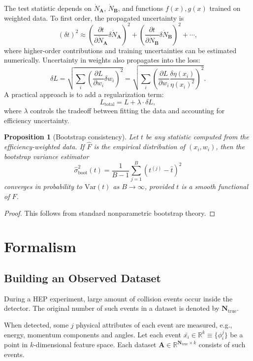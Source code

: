 \documentclass{article}
\newtheorem{proposition}[theorem]{Proposition}
\newcommand{\dataset}[1]{{\mathbf{#1}}}         %
\newcommand{\true}[1]{{\dataset{#1}}_{\text{true}}}  %
\begin{document}
The test statistic depends on \( \dot{N}_{\mathbf{A}} \), \( \dot{N}_{\mathbf{B}} \), and functions \( f(x), g(x) \) trained on weighted data. To first order, the propagated uncertainty is
\[
(\delta t)^2 \approx \left( \frac{\partial t}{\partial \dot{N}_{\mathbf{A}}} \delta \dot{N}_{\mathbf{A}} \right)^2 + \left( \frac{\partial t}{\partial \dot{N}_{\mathbf{B}}} \delta \dot{N}_{\mathbf{B}} \right)^2 + \cdots,
\]
where higher-order contributions and training uncertainties can be estimated numerically. Uncertainty in weights also propagates into the loss:
\[
\delta L = \sqrt{
\sum_{i} \left( \frac{\partial L}{\partial w_i} \delta w_i \right)^2
} = \sqrt{
\sum_{i} \left( \frac{\partial L}{\partial w_i} \frac{\delta \eta(x_i)}{\eta(x_i)^2} \right)^2
}.
\]
A practical approach is to add a regularization term:
\[
L_{\mathrm{total}} = L + \lambda \cdot \delta L,
\]
where \(\lambda\) controls the tradeoff between fitting the data and accounting for efficiency uncertainty.

\begin{proposition}[Bootstrap consistency]
    Let \(t\) be any statistic computed from the efficiency-weighted data. If \(\hat{F}\) is the empirical distribution of \((x_i, w_i)\), then the bootstrap variance estimator
\[
\hat{\sigma}^2_{\mathrm{boot}}(t) = \frac{1}{B-1} \sum_{j=1}^B \left( t^{(j)} - \bar{t} \right)^2
\]
converges in probability to \(\mathrm{Var}(t)\) as \(B \to \infty\), provided \(t\) is a smooth functional of \(F\).
\end{proposition}

\begin{proof}
     This follows from standard nonparametric bootstrap theory. 
\end{proof}


\section{Formalism}

\subsection{Building an Observed Dataset}

During a HEP experiment, large amount of collision events occur inside the detector. The original number of such events in a dataset is denoted by $\true{N}$.

When detected, some $j$ physical attributes of each event are measured, e.g., energy, momentum components and angles. Let each event \( \bar{x_i} \in \mathbb{R}^k \equiv \{\phi^j_i\}\) be a point in \( k \)-dimensional feature space. Each dataset \(\mathbf{A} \in \mathbb{R}^{\true{N} \times k}\) consists of such events.
\end{document}
